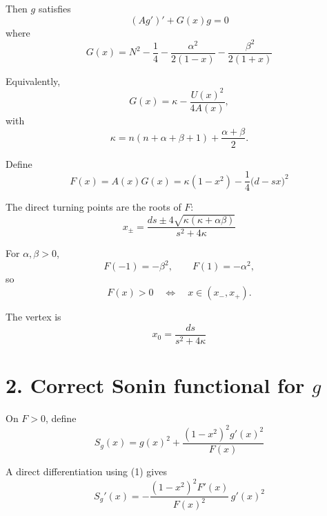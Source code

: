 \documentclass[11pt]{article}
\begin{document}
Then \(g\) satisfies
\begin{equation}
\boxed{
(A g')'+G(x)g=0
}
\tag{1}
\end{equation}
where
\begin{equation}
\boxed{
G(x)
=
N^2-\frac14
-\frac{\alpha^2}{2(1-x)}
-\frac{\beta^2}{2(1+x)}
}
\tag{2}
\end{equation}

Equivalently,
\begin{equation*}
G(x)=\kappa-\frac{U(x)^2}{4A(x)},
\end{equation*}
with
\begin{equation*}
\kappa=n(n+\alpha+\beta+1)+\frac{\alpha+\beta}{2}.
\end{equation*}

Define
\begin{equation}
\boxed{
F(x)=A(x)G(x)
=
\kappa(1-x^2)-\frac14\bigl(d-sx\bigr)^2
}
\tag{3}
\end{equation}

The direct turning points are the roots of \(F\):
\begin{equation}
\boxed{
x_\pm
=
\frac{ds\pm4\sqrt{\kappa(\kappa+\alpha\beta)}}{s^2+4\kappa}
}
\tag{4}
\end{equation}

For \(\alpha,\beta>0\),
\begin{equation*}
F(-1)=-\beta^2,\qquad F(1)=-\alpha^2,
\end{equation*}
so
\begin{equation*}
F(x)>0
\quad\Longleftrightarrow\quad
x\in(x_-,x_+).
\end{equation*}

The vertex is
\begin{equation}
\boxed{
x_0=\frac{ds}{s^2+4\kappa}
}
\tag{5}
\end{equation}

\section*{2. Correct Sonin functional for \(g\)}

On \(F>0\), define
\begin{equation}
\boxed{
S_g(x)
=
g(x)^2+\frac{(1-x^2)^2g'(x)^2}{F(x)}
}
\tag{6}
\end{equation}

A direct differentiation using (1) gives
\begin{equation}
\boxed{
S_g'(x)
=
-\frac{(1-x^2)^2F'(x)}{F(x)^2}\,g'(x)^2
}
\tag{7}
\end{equation}
\end{document}
